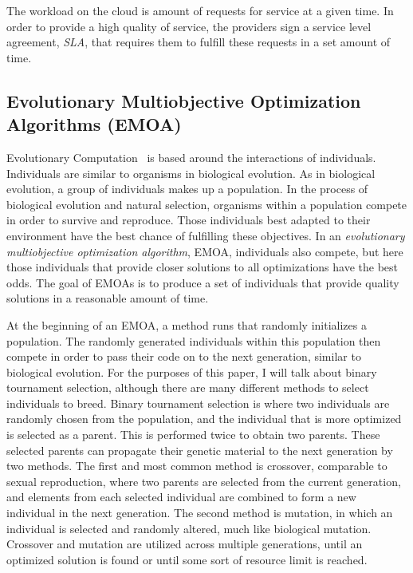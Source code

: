 \documentclass{sig-alternate}
\begin{document}
The workload on the cloud is amount of requests for service at a given time. In order to provide a high quality of service, the providers sign a service level agreement, \emph{SLA}, that requires them to fulfill these requests in a set amount of time. 

\subsection{Evolutionary Multiobjective Optimization Algorithms (EMOA)}
\label{sec:EMOA}

Evolutionary Computation~\cite{poli08:fieldguide} is based around the interactions of individuals. Individuals are similar to organisms in biological evolution. As in biological evolution, a group of individuals makes up a population. In the process of biological evolution and natural selection, organisms within a population compete in order to survive and reproduce. Those individuals best adapted to their environment have the best chance of fulfilling these objectives.  In an \emph{evolutionary multiobjective optimization algorithm}, EMOA, individuals also compete, but here those individuals that provide closer solutions to all optimizations have the best odds. The goal of EMOAs is to produce a set of individuals that provide quality solutions in a reasonable amount of time. 

At the beginning of an EMOA, a method runs that randomly initializes a population. The randomly generated individuals within this population then compete in order to pass their code on to the next generation, similar to biological evolution. For the purposes of this paper, I will talk about binary tournament selection, although there are many different methods to select individuals to breed. Binary tournament selection is where two individuals are randomly chosen from the population, and the individual that is more optimized is selected as a parent. This is performed twice to obtain two parents.  These selected parents can propagate their genetic material to the next generation by two methods. The first and most common method is crossover, comparable to sexual reproduction, where two parents are selected from the current generation, and elements from each selected individual are combined to form a new individual in the next generation. The second method is mutation, in which an individual is selected and randomly altered, much like biological mutation. Crossover and mutation are utilized across multiple generations, until an optimized solution is found or until some sort of resource limit is reached.
\end{document}
